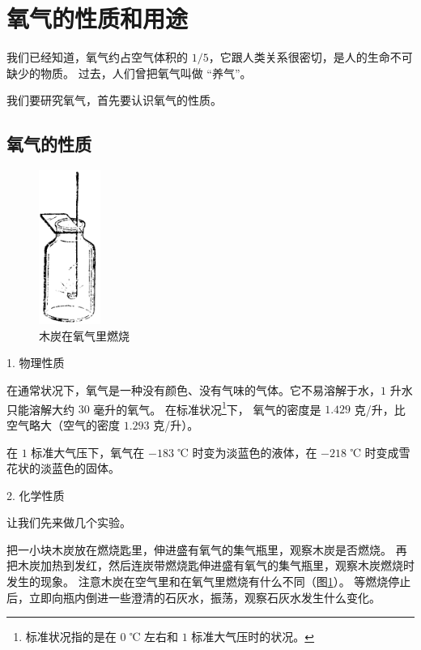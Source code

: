 \section{氧气的性质和用途}\label{sec:1-2}

我们已经知道，氧气约占空气体积的 $1/5$，它跟人类关系很密切，是人的生命不可缺少的物质。
过去，人们曾把氧气叫做 “养气”。

我们要研究氧气，首先要认识氧气的性质。

\subsection{氧气的性质}

\begin{figure}
    \centering
    \includegraphics[width=2cm]{../pic/czhx1-ch1-3}
    \caption{木炭在氧气里燃烧}\label{fig:1-3}
\end{figure}

1. 物理性质

在通常状况下，氧气是一种没有颜色、没有气味的气体。它不易溶解于水，$1$ 升水只能溶解大约 $30$ 毫升的氧气。
在标准状况\footnote{标准状况指的是在 $0$ ℃ 左右和 $1$ 标准大气压时的状况。}下，
氧气的密度是 $1.429$ 克/升，比空气略大（空气的密度 $1.293$ 克/升）。

在 $1$ 标准大气压下，氧气在 $-183$ ℃ 时变为淡蓝色的液体，在 $-218$ ℃ 时变成雪花状的淡蓝色的固体。

2. 化学性质

让我们先来做几个实验。

\begin{shiyan}
    把一小块木炭放在燃烧匙里，伸进盛有氧气的集气瓶里，观察木炭是否燃烧。
    再把木炭加热到发红，然后连炭带燃烧匙伸进盛有氧气的集气瓶里，观察木炭燃烧时发生的现象。
    注意木炭在空气里和在氧气里燃烧有什么不同（图\ref{fig:1-3}）。
    等燃烧停止后，立即向瓶内倒进一些澄清的石灰水，振荡，观察石灰水发生什么变化。
\end{shiyan}



